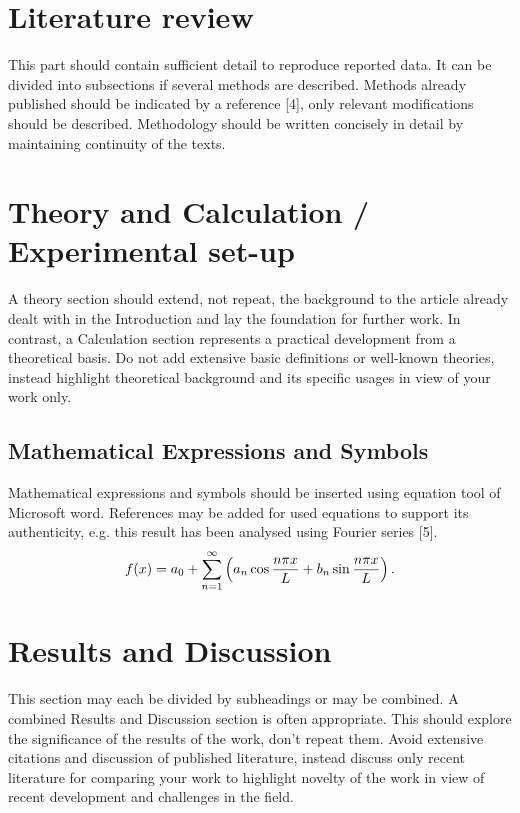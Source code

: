 \documentclass[11pt,twocolumn]{article}
\begin{document}
\section{Literature review}
This part should contain sufficient detail to reproduce reported data. It can be divided into subsections if several methods are described. Methods already published should be indicated by a reference [4], only relevant modifications should be described. Methodology should be written concisely in detail by maintaining continuity of the texts. 

\section{Theory and Calculation / Experimental set-up}

A theory section should extend, not repeat, the background to the article already dealt with in the Introduction and lay the foundation for further work. In contrast, a Calculation section represents a practical development from a theoretical basis. Do not add extensive basic definitions or well-known theories, instead highlight theoretical background and its specific usages in view of your work only.
\subsection{Mathematical Expressions and Symbols}
Mathematical expressions and symbols should be inserted using equation tool of Microsoft word. References may be added for used equations to support its authenticity, e.g. this result has been analysed using Fourier series [5].
\begin{equation}
f(x) = a_0 + \sum_{n=1}^\infty \left( a_n \cos {n\pi x\over L} + b_n \sin {n\pi x \over L} \right).
\end{equation}

\section{Results and Discussion}
This section may each be divided by subheadings or may be combined.  A combined Results and Discussion section is often appropriate.  This should explore the significance of the results of the work, don’t repeat them. Avoid extensive citations and discussion of published literature, instead discuss only recent literature for comparing your work to highlight novelty of the work in view of recent development and challenges in the field.
\end{document}
